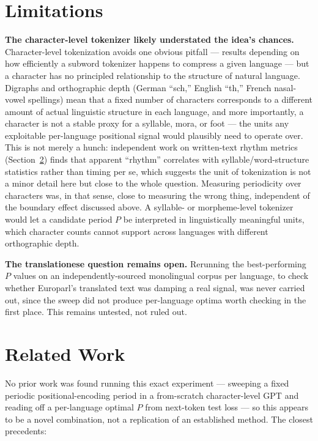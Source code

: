 \documentclass[11pt]{article}
\begin{document}
\section{Limitations}
\label{sec:limitations}

\textbf{The character-level tokenizer likely understated the idea's chances.} Character-level tokenization avoids one obvious pitfall --- results depending on how efficiently a subword tokenizer happens to compress a given language --- but a character has no principled relationship to the structure of natural language. Digraphs and orthographic depth (German ``sch,'' English ``th,'' French nasal-vowel spellings) mean that a fixed number of characters corresponds to a different amount of actual linguistic structure in each language, and more importantly, a character is not a stable proxy for a syllable, mora, or foot --- the units any exploitable per-language positional signal would plausibly need to operate over. This is not merely a hunch: independent work on written-text rhythm metrics (Section~\ref{sec:related}) finds that apparent ``rhythm'' correlates with syllable/word-structure statistics rather than timing per se, which suggests the unit of tokenization is not a minor detail here but close to the whole question. Measuring periodicity over characters was, in that sense, close to measuring the wrong thing, independent of the boundary effect discussed above. A syllable- or morpheme-level tokenizer would let a candidate period $P$ be interpreted in linguistically meaningful units, which character counts cannot support across languages with different orthographic depth.

\textbf{The translationese question remains open.} Rerunning the best-performing $P$ values on an independently-sourced monolingual corpus per language, to check whether Europarl's translated text was damping a real signal, was never carried out, since the sweep did not produce per-language optima worth checking in the first place. This remains untested, not ruled out.

\section{Related Work}
\label{sec:related}

No prior work was found running this exact experiment --- sweeping a fixed periodic positional-encoding period in a from-scratch character-level GPT and reading off a per-language optimal $P$ from next-token test loss --- so this appears to be a novel combination, not a replication of an established method. The closest precedents:
\end{document}
